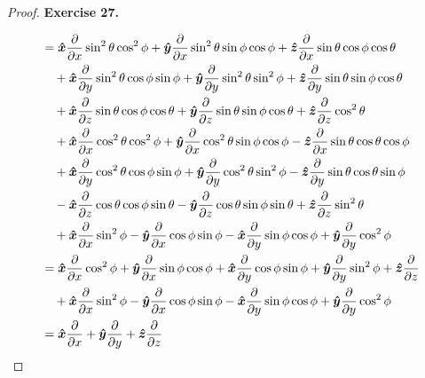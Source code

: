 \documentclass[11pt]{article}
\newcommand{\hatx}{\bm{\hat{x}}}
\newcommand{\haty}{\bm{\hat{y}}}
\newcommand{\hatz}{\bm{\hat{z}}}
\theoremstyle{definition}
\begin{document}
\begin{proof}{\textbf{Exercise 27.}}
\begin{align*}
    \end{align*}
    \begin{align*}
        &= \hatx\partialderivative{}{x}\sin^2\theta\cos^2\phi
        + \haty\partialderivative{}{x}\sin^2\theta\sin\phi\cos\phi
        + \hatz\partialderivative{}{x}\sin\theta\cos\phi\cos\theta\\
        &\quad + \hatx\partialderivative{}{y}\sin^2\theta\cos\phi\sin\phi
        + \haty\partialderivative{}{y}\sin^2\theta\sin^2\phi
        + \hatz\partialderivative{}{y}\sin\theta\sin\phi\cos\theta\\
        &\quad + \hatx\partialderivative{}{z}\sin\theta\cos\phi\cos\theta
        + \haty\partialderivative{}{z}\sin\theta\sin\phi\cos\theta
        + \hatz\partialderivative{}{z}\cos^2\theta\\
        &\quad + \hatx\partialderivative{}{x}\cos^2\theta\cos^2\phi
        + \haty\partialderivative{}{x}\cos^2\theta\sin\phi\cos\phi
        - \hatz\partialderivative{}{x}\sin\theta\cos\theta\cos\phi\\
        &\quad + \hatx\partialderivative{}{y}\cos^2\theta\cos\phi\sin\phi
        + \haty\partialderivative{}{y}\cos^2\theta\sin^2\phi
        - \hatz\partialderivative{}{y}\sin\theta\cos\theta\sin\phi\\
        &\quad - \hatx\partialderivative{}{z}\cos\theta\cos\phi\sin\theta
        - \haty\partialderivative{}{z}\cos\theta\sin\phi\sin\theta
        + \hatz\partialderivative{}{z}\sin^2\theta\\
        &\quad +\hatx\partialderivative{}{x}\sin^2\phi
        - \haty\partialderivative{}{x}\cos\phi\sin\phi
        -\hatx\partialderivative{}{y}\sin\phi\cos\phi
        + \haty\partialderivative{}{y}\cos^2\phi\\
        &= \hatx\partialderivative{}{x}\cos^2\phi
        + \haty\partialderivative{}{x}\sin\phi\cos\phi
        + \hatx\partialderivative{}{y}\cos\phi\sin\phi
        + \haty\partialderivative{}{y}\sin^2\phi
        + \hatz\partialderivative{}{z}\\
        &\quad +\hatx\partialderivative{}{x}\sin^2\phi
        - \haty\partialderivative{}{x}\cos\phi\sin\phi
        -\hatx\partialderivative{}{y}\sin\phi\cos\phi
        + \haty\partialderivative{}{y}\cos^2\phi\\
        &= \hatx\partialderivative{}{x}
        + \haty\partialderivative{}{y}
        + \hatz\partialderivative{}{z}
    \end{align*}
\end{proof}
\end{document}

